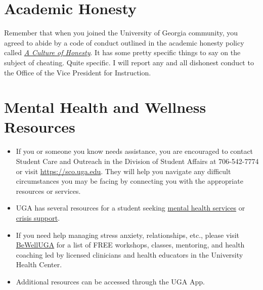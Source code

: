 \documentclass[11pt, letterpaper]{article}
\begin{document}
\section*{Academic Honesty}

Remember that when you joined the University of Georgia community, you agreed to abide by a code of conduct outlined in the academic honesty policy called \href{https://honesty.uga.edu/Academic-Honesty-Policy/Introduction/}{\textit{A Culture of Honesty}}. It has some pretty specific things to say on the subject of cheating. Quite specific. I will report any and all dishonest conduct to the Office of the Vice President for Instruction.

\section*{Mental Health and Wellness Resources}

\begin{itemize}
	\item If you or someone you know needs assistance, you are encouraged to contact Student Care and Outreach in the Division of Student Affairs at 706-542-7774 or visit \href{https://sco.uga.edu}{https://sco.uga.edu}. They will help you navigate any difficult circumstances you may be facing by connecting you with the appropriate resources or services. 
	\item UGA has several resources for a student seeking \href{https://www.uhs.uga.edu/bewelluga/bewelluga}{mental health services} or \href{https://www.uhs.uga.edu/info/emergencies}{crisis support}. 
	\item If you need help managing stress anxiety, relationships, etc., please visit \href{https://www.uhs.uga.edu/bewelluga/bewelluga}{BeWellUGA} for a list of FREE workshops, classes, mentoring, and health coaching led by licensed clinicians and health educators in the University Health Center.
	\item Additional resources can be accessed through the UGA App.
\end{itemize}


\end{document}
